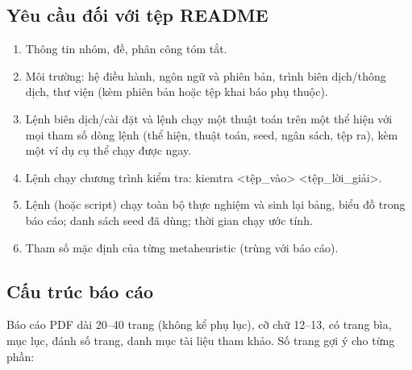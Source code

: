\documentclass[a4paper,11pt]{article}
\begin{document}
\subsection{Yêu cầu đối với tệp README}
\begin{enumerate}
\item Thông tin nhóm, đề, phân công tóm tắt.
\item Môi trường: hệ điều hành, ngôn ngữ và phiên bản, trình biên dịch/thông dịch, thư viện (kèm phiên bản hoặc tệp khai báo phụ thuộc).
\item Lệnh biên dịch/cài đặt và lệnh chạy một thuật toán trên một thể hiện với mọi tham số dòng lệnh (thể hiện, thuật toán, seed, ngân sách, tệp ra), kèm một ví dụ cụ thể chạy được ngay.
\item Lệnh chạy chương trình kiểm tra: kiemtra <tệp\_vào> <tệp\_lời\_giải>.
\item Lệnh (hoặc script) chạy toàn bộ thực nghiệm và sinh lại bảng, biểu đồ trong báo cáo; danh sách seed đã dùng; thời gian chạy ước tính.
\item Tham số mặc định của từng metaheuristic (trùng với báo cáo).
\end{enumerate}
\subsection{Cấu trúc báo cáo}
Báo cáo PDF dài 20–40 trang (không kể phụ lục), cỡ chữ 12–13, có trang bìa, mục lục, đánh số trang, danh mục tài liệu tham khảo. Số trang gợi ý cho từng phần:
\end{document}
